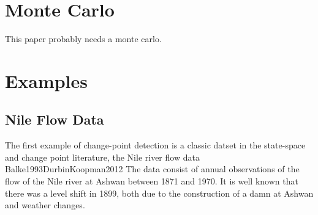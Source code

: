 \documentclass{article}
\begin{document}
\section{Monte Carlo}
\label{sec:monte-carlo}

This paper probably needs a monte carlo.

\section{Examples}
\label{sec:examples}

\subsection{Nile Flow Data}
\label{sec:nile}

The first example of change-point detection is a classic datset in the state-space and change point literature, the Nile river flow data \textcite{Cobb1978}{Balke1993}{DurbinKoopman2012}
The data consist of annual observations of the flow of the Nile river at Ashwan between 1871 and 1970. 
It is well known that there was a level shift in 1899, both due to the construction of a damn at Ashwan and weather changes.




\printbibliography{}
\end{document}
